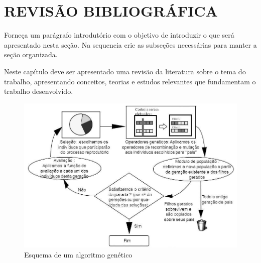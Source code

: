 \section{REVISÃO BIBLIOGRÁFICA} \label{ch:referencial-teorico}

Forneça um parágrafo introdutório com o objetivo de introduzir o que será apresentado nesta seção. Na sequencia crie as subseções necessárias para manter a seção organizada. 

Neste capítulo deve ser apresentado uma revisão da literatura sobre o tema do trabalho, apresentando conceitos, teorias e estudos relevantes que fundamentam o trabalho desenvolvido.  


\begin{figure} [htb]
    \begin{center}
	 \caption{\label{fig:ag}Esquema de um algoritmo genético}
        \includegraphics[scale=0.6]{imagens/revisao-bibliografica/esquemaAlgGenetico_pag64.png}
    	\end{center}
    \end{figure}
    
